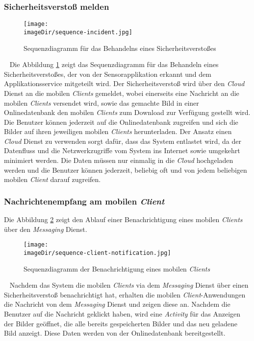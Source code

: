 \subsubsection{Sicherheitsverstoß melden}
\begin{figure}[h]
	\centering
	\texttt{[image: \\imageDir/sequence-incident.jpg]}
	\caption{Sequenzdiagramm für das Behandelns eines Sicherheitsverstoßes}
	\label{fig:image-sequence-incident}
\end{figure}
\ \newline
Die Abbildung \ref{fig:image-sequence-incident} zeigt das Sequenzdiagramm für das Behandeln eines Sicherheitsverstoßes, der von der Sensorapplikation erkannt und dem Applikationsservice mitgeteilt wird. Der Sicherheitsverstoß wird über den \emph{Cloud} Dienst an die mobilen \emph{Clients} gemeldet, wobei einerseits eine Nachricht an die mobilen \emph{Clients} versendet wird, sowie das gemachte Bild in einer Onlinedatenbank den mobilen \emph{Clients} zum Download zur Verfügung gestellt wird. Die Benutzer können jederzeit auf die Onlinedatenbank zugreifen und sich die Bilder auf ihren jeweiligen mobilen \emph{Clients} herunterladen. 
\newline
\newline
Der Ansatz einen \emph{Cloud} Dienst zu verwenden sorgt dafür, dass das System entlastet wird, da der Datenfluss und die Netzwerkzugriffe vom System ins Internet sowie umgekehrt minimiert werden. Die Daten müssen nur einmalig in die \emph{Cloud} hochgeladen werden und die Benutzer können jederzeit, beliebig oft und von jedem beliebigen mobilen \emph{Client} darauf zugreifen.
\newpage
 
\subsubsection{Nachrichtenempfang am mobilen \emph{Client}}
Die Abbildung \ref{fig:image-sequence-client-notification} zeigt den Ablauf einer Benachrichtigung eines mobilen \emph{Clients} über den \emph{Messaging} Dienst.
\begin{figure}[h]
	\centering
	\texttt{[image: \\imageDir/sequence-client-notification.jpg]}
	\caption{Sequenzdiagramm der Benachrichtigung eines mobilen \emph{Clients}}
	\label{fig:image-sequence-client-notification}
\end{figure}
\ \newline
Nachdem das System die mobilen \emph{Clients} via dem \emph{Messaging} Dienst über einen Sicherheitsverstoß benachrichtigt hat, erhalten die mobilen \emph{Client}-Anwendungen die Nachricht von dem \emph{Messaging} Dienst und zeigen diese an. Nachdem die Benutzer auf die Nachricht geklickt haben, wird eine \emph{Activity} für das Anzeigen der Bilder geöffnet, die alle bereits gespeicherten Bilder und das neu geladene Bild anzeigt. Diese Daten werden von der Onlinedatenbank bereitgestellt. 